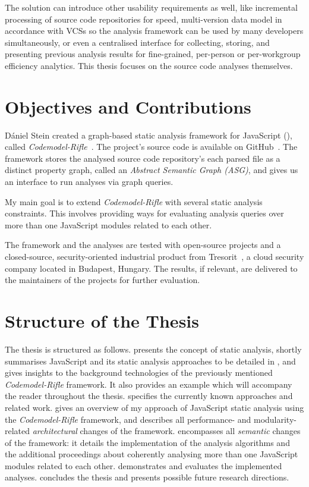 The solution can introduce other usability requirements as well, like incremental processing of source code repositories for speed, multi-version data model in accordance with VCSs so the analysis framework can be used by many developers simultaneously, or even a centralised interface for collecting, storing, and presenting previous analysis results for fine-grained, per-person or per-workgroup efficiency analytics. This thesis focuses on the source code analyses themselves.


\section{Objectives and Contributions}

Dániel Stein created a graph-based static analysis framework for JavaScript (\es), called \emph{Codemodel-Rifle}~\cite{stein-daniel-msc}. The project's source code is available on GitHub~\cite{codemodel-rifle-github}. The framework stores the analysed source code repository's each parsed file as a distinct property graph, called an \emph{Abstract Semantic Graph (ASG)}, and gives us an interface to run analyses via graph queries.

My main goal is to extend \emph{Codemodel-Rifle} with several static analysis constraints. This involves providing ways for evaluating analysis queries over more than one JavaScript modules related to each other.

The framework and the analyses are tested with open-source projects and a closed-source, security-oriented industrial product from Tresorit~\cite{tresorit}, a cloud security company located in Budapest, Hungary. The results, if relevant, are delivered to the maintainers of the projects for further evaluation.


\section{Structure of the Thesis}

The thesis is structured as follows. \emph{} presents the concept of static analysis, shortly summarises JavaScript and its static analysis approaches to be detailed in , and gives insights to the background technologies of the previously mentioned \emph{Codemodel-Rifle} framework. It also provides an example which will accompany the reader throughout the thesis. \emph{} specifies the currently known approaches and related work. \emph{} gives an overview of my approach of JavaScript static analysis using the \emph{Codemodel-Rifle} framework, and describes all performance- and modularity-related \emph{architectural} changes of the framework. \emph{} encompasses all \emph{semantic} changes of the framework: it details the implementation of the analysis algorithms and the additional proceedings about coherently analysing more than one JavaScript modules related to each other. \emph{} demonstrates and evaluates the implemented analyses. \emph{} concludes the thesis and presents possible future research directions.

